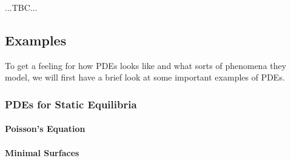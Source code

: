 

...TBC...


\subsection{Examples}
To get a feeling for how PDEs looks like and what sorts of phenomena they model, we will first have a brief look at some important examples of PDEs.


\subsubsection{PDEs for Static Equilibria}

\paragraph{Poisson's Equation}



\paragraph{Minimal Surfaces}

